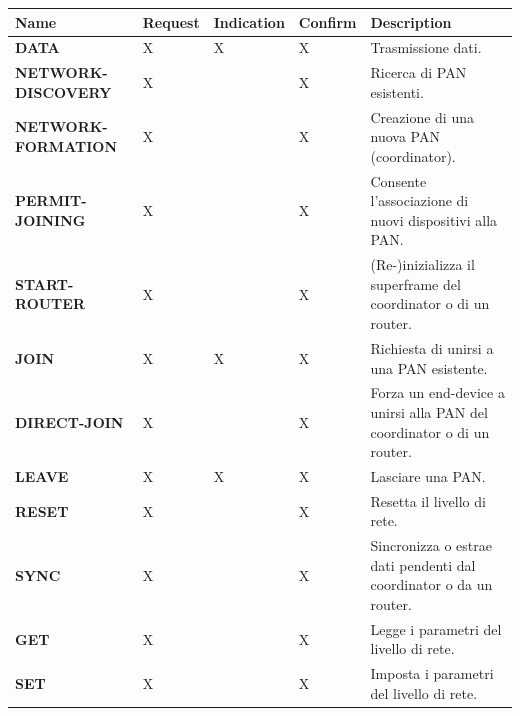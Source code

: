 \documentclass[
  italian,
  openany]{book}
\newcounter{none} %
\begin{document}
{\def\LTcaptype{none} %
\begin{longtable}[]{@{}
  >{\raggedright\arraybackslash}p{}
  >{\centering\arraybackslash}p{}
  >{\centering\arraybackslash}p{}
  >{\centering\arraybackslash}p{}
  >{\raggedright\arraybackslash}p{}@{}}
\toprule\noalign{}
\begin{minipage}[b]{\linewidth}\raggedright
\textbf{Name}
\end{minipage} & \begin{minipage}[b]{\linewidth}\centering
\textbf{Request}
\end{minipage} & \begin{minipage}[b]{\linewidth}\centering
\textbf{Indication}
\end{minipage} & \begin{minipage}[b]{\linewidth}\centering
\textbf{Confirm}
\end{minipage} & \begin{minipage}[b]{\linewidth}\raggedright
\textbf{Description}
\end{minipage} \\
\midrule\noalign{}
\endhead
\bottomrule\noalign{}
\endlastfoot
\textbf{DATA} & X & X & X & Trasmissione dati. \\
\textbf{NETWORK-DISCOVERY} & X & & X & Ricerca di PAN esistenti. \\
\textbf{NETWORK-FORMATION} & X & & X & Creazione di una nuova PAN
(coordinator). \\
\textbf{PERMIT-JOINING} & X & & X & Consente l'associazione di nuovi
dispositivi alla PAN. \\
\textbf{START-ROUTER} & X & & X & (Re-)inizializza il superframe del
coordinator o di un router. \\
\textbf{JOIN} & X & X & X & Richiesta di unirsi a una PAN esistente. \\
\textbf{DIRECT-JOIN} & X & & X & Forza un end-device a unirsi alla PAN
del coordinator o di un router. \\
\textbf{LEAVE} & X & X & X & Lasciare una PAN. \\
\textbf{RESET} & X & & X & Resetta il livello di rete. \\
\textbf{SYNC} & X & & X & Sincronizza o estrae dati pendenti dal
coordinator o da un router. \\
\textbf{GET} & X & & X & Legge i parametri del livello di rete. \\
\textbf{SET} & X & & X & Imposta i parametri del livello di rete. \\
\end{longtable}
}
\end{document}

